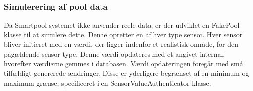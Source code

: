 \subsubsection{Simulerering af pool data}
Da Smartpool systemet ikke anvender reele data, er der udviklet en FakePool klasse til at simulere dette. Denne opretter en af hver type sensor. Hver sensor bliver initieret med en værdi, der ligger indenfor et realistisk område, for den pågældende sensor type. 
Denne værdi opdateres med et angivet internal, hvorefter værdierne gemmes i databasen. Værdi opdateringen foregår med små tilfældigt genererede ændringer. Disse er yderligere begrænset af en minimum og maximum grænse, specificeret i en SensorValueAuthenticator klasse.  
